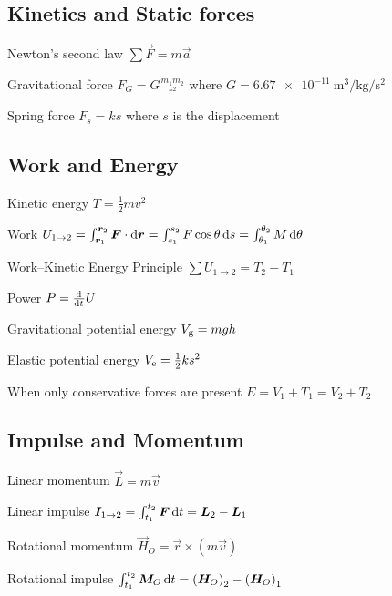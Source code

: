 \documentclass{article}
\begin{document}
\subsection{Kinetics and Static forces}
\label{sec:particle-kinetics}

\begin{description*}
\item[Newton's second law]
  \(\sum\vec{F} = m\vec{a}\)
\item[Gravitational force]
  \(F_G = G\frac{m_1m_2}{r^2}\) where
  \(G = \SI{6.67e-11}{\cubic\meter\per\kilogram\per\square\second}\)
\item[Spring force]
  \(F_s = ks\) where $s$ is the displacement
\end{description*}

\subsection{Work and Energy}
\label{sec:particle-energy}

\begin{description*}
\item[Kinetic energy]
  \(T = \frac12mv^2\)
\item[Work]
  \(U_{1\rightarrow2} = \int_{\vec{r}_1}^{\vec{r}_2}\vec{F}\cdot\dif\vec{r}
  = \int_{s_1}^{s_2}F\cos\theta\dif{s} = \int_{\theta_1}^{\theta_2}M\dif{\theta}\)
\item[Work--Kinetic Energy Principle]
  \(\sum U_{1\rightarrow2} = T_2 - T_1\)
\item[Power]
  \(P = \od{}{t}U\)
\item[Gravitational potential energy]
  \(V_{\mathrm{g}} = mgh\)
\item[Elastic potential energy]
  \(V_{\mathrm{e}} = \frac12ks^2\)
\item[When only conservative forces are present]
  \(E = V_1 + T_1 = V_2 + T_2\)

\end{description*}

\subsection{Impulse and Momentum}
\label{sec:particle-momentum}

\begin{description*}
\item[Linear momentum]
  \(\vec{L} = m\vec{v}\)
\item[Linear impulse]
  \(\vec{I}_{1\rightarrow2} = \int_{t_1}^{t_2}\vec{F}\dif{t} = \vec{L}_2 - \vec{L}_1\)
\item[Rotational momentum]
  \(\vec{H}_O = \vec{r} \times (m\vec{v})\)
\item[Rotational impulse]
  \(\int_{t_1}^{t_2}\vec{M}_O\dif{t} = {(\vec{H}_O)}_2 - {(\vec{H}_O)}_1\)
\end{description*}
\end{document}
